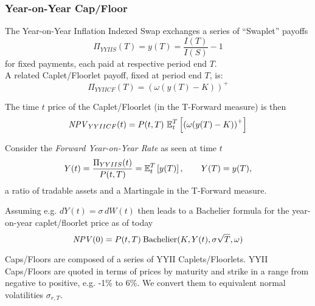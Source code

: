 \subsubsection{Year-on-Year Cap/Floor}
\label{pricing:inf_yyiicapfloor}

The Year-on-Year Inflation Indexed Swap exchanges a series of ``Swaplet'' payoffs 
$$
\Pi_{YYIIS}(T) = y(T) = \frac{I(T)}{I(S)} - 1
$$
for fixed payments, each paid at respective period end $T$. \\

A related Caplet/Floorlet payoff, fixed at period end $T$, is:
$$
\Pi_{YYIICF}(T) = \left(\omega(y(T) - K)\right)^+ 
$$

\medskip
The time $t$ price of the Caplet/Floorlet (in the T-Forward measure) is then
$$
\mathit{NPV}_{YYIICF}(t) = P(t,T)\,\operatorname{\mathbb{E}}^T_t\left[ \left(\omega(y(T) -K)\right)^+\right] 
$$

Consider the {\em Forward Year-on-Year Rate} as seen at time $t$
$$
Y(t) = \frac{\Pi_{YYIIS}(t)}{P(t,T)} = \operatorname{\mathbb{E}}^T_t\left[y(T)\right], \qquad Y(T)= y(T),
$$
a ratio of tradable assets and a Martingale in the T-Forward measure. 

\medskip
Assuming e.g. $dY(t) = \sigma\,dW(t)$ then leads to a Bachelier formula for the 
year-on-year caplet/floorlet price as of today
$$
\NPV(0) %
= P(t,T)\: \mbox{Bachelier}(K, Y(t),\sigma\sqrt{T}, \omega)
$$

\medskip
Caps/Floors are composed of a series of YYII Caplets/Floorlets.
YYII Caps/Floors are quoted in terms of prices by maturity and strike in a range 
from negative to positive, e.g. -1\% to 6\%. We convert them to equivalent 
normal volatilities $\sigma_{r,T}$.

